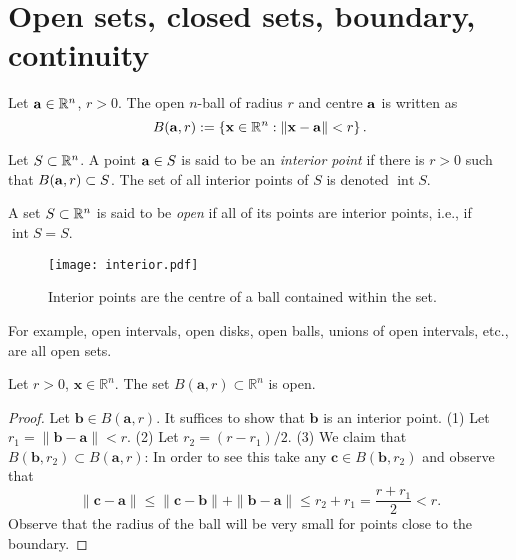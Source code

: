 \section{Open sets, closed sets, boundary, continuity}

Let \(\aa \in \bR^n\), \(r>0\).
The open \(n\)-ball of radius \(r\) and centre \(\aa\) is written as
\[
    B(\aa,r):= \left\{ \xx \in \bR^n : \norm{\xx - \aa}< r  \right\}.
\]

\begin{definition}
    Let \(S \subset \bR^n\).
    A point \(\aa \in S\) is said to be an \emph{interior point} if there is \(r>0\) such that \( B(\aa,r) \subset S\).
    The set of all interior points of \(S\) is denoted \(\operatorname{int} S\).
\end{definition}

\begin{definition}
    A set \(S \subset \bR^n\) is said to be \emph{open} if all of its points are interior points, i.e., if \(\operatorname{int} S = S\).
\end{definition}



\begin{figure}[htbp]
    \begin{center}
        \texttt{[image: interior.pdf]}
        \caption{Interior points are the centre of a ball contained within the set.}
    \end{center}
\end{figure}


For example,
open intervals, open disks, open balls, unions of open intervals, etc., are all open sets.

\begin{lemma*}
    Let $r>0$, $\mathbf{x} \in \mathbb{R}^n$. The set $B(\mathbf{a},r) \subset \mathbb{R}^n$ is open.
\end{lemma*}
\begin{proof}
    Let $\mathbf{b} \in B(\mathbf{a},r)$. It suffices to show that $\mathbf{b}$ is an interior point.
    (1) Let $r_1 = \| \mathbf{b} - \mathbf{a} \| < r$.
    (2) Let $r_2 = (r - r_1)/2$.
    (3) We claim that $B(\mathbf{b},r_2) \subset B(\mathbf{a},r)$:
    In order to see this take any $\mathbf{c} \in B(\mathbf{b},r_2)$ and observe that
    $$\| \mathbf{c} - \mathbf{a} \| \leq \| \mathbf{c} - \mathbf{b} \|  + \| \mathbf{b} - \mathbf{a} \| \leq r_2 + r_1 = \frac{r + r_1}{2} < r.$$
    Observe that the radius of the ball will be very small for points close to the boundary.
\end{proof}



